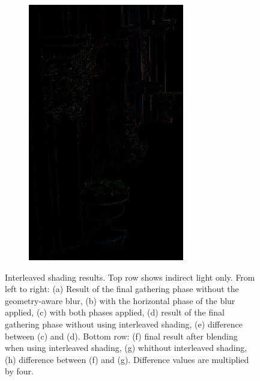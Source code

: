 \begin{figure}[htb]
\begin{subfigure}[b]{0.32\textwidth}
        \includegraphics[width=.95\textwidth]{screenshots/interleaved_difference_shaded}
        \caption{}
        \label{fig:results:interleaved_difference_shaded}
    \end{subfigure}

      \caption{Interleaved shading results. Top row shows indirect light only. From left to right: (a) Result of the final gathering phase without the geometry-aware blur, (b) with the horizontal phase of the blur applied, (c) with both phases applied, (d) result of the final gathering phase without using interleaved shading, (e) difference between (c) and (d). Bottom row: (f) final result after blending when using interleaved shading, (g) whithout interleaved shading, (h) difference between (f) and (g). Difference values are multiplied by four.}
      \label{fig:results:interleaved_quality}
\end{figure}


